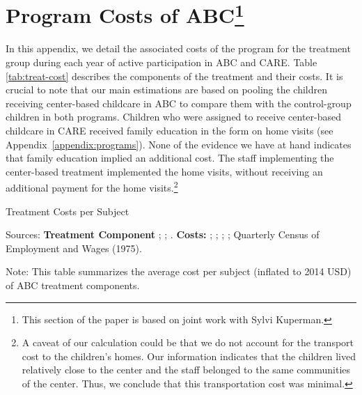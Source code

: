 \section[Program Costs of ABC]{Program Costs of ABC\footnote{This section of the paper is based on joint work with Sylvi Kuperman.}} \label{app:programcosts}

\noindent In this appendix, we detail the associated costs of the program for the treatment group during each year of active participation in ABC and CARE. Table \ref{tab:treat-cost}  describes the components of the treatment and their costs. It is crucial to note that our main estimations are based on pooling the children receiving center-based childcare in ABC to compare them with the control-group children in both programs. Children who were assigned to receive center-based childcare in CARE received family education in the form on home visits (see Appendix~\ref{appendix:programs}). None of the evidence we have at hand indicates that family education implied an additional cost. The staff implementing the center-based treatment implemented the home visits, without receiving an additional payment for the home visits.\footnote{A caveat of our calculation could be that we do not account for the transport cost to the children's homes. Our information indicates that the children lived relatively close to the center and the staff belonged to the same communities of the center. Thus, we conclude that this transportation cost was minimal.} \\

\begin{table}[H]
\caption{Treatment Costs per Subject} \label{tab:treat-cost}
\centering
\begin{adjustbox}{max width=\textwidth}
\begin{threeparttable}
\scriptsize

\begin{tablenotes}
\scriptsize
\item Sources: \textbf{Treatment Component} \cite{Ramey_Collier_etal_1976_CarolinaAbecedarianProject}; \cite{Ramey_McGinness_etal_1982_Abecedarianapproach}; \cite{Clarke_Campbell_1998_ABC_Comparison_ECRQ}. \textbf{Costs:} \cite{Barnett_Masse_2002_benefitcost}; \cite{FPGC_Progress-Report_1973}; \cite{Cutler_Meara_1998_Med-Costs_BOOK}; \cite{Helburn_1995_Childcare-Report}; Quarterly Census of Employment and Wages (1975).

\item Note: This table summarizes the average cost per subject (inflated to 2014 USD) of ABC treatment components.
\end{tablenotes}
\end{threeparttable}
\end{adjustbox}
\end{table}

